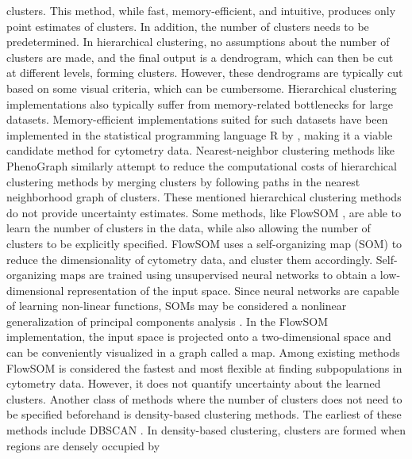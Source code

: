 \documentclass[12pt,]{article}
\begin{document}
clusters. This method, while fast, memory-efficient, and intuitive, produces
only point estimates of clusters. In addition, the number of clusters needs to
be predetermined.
In hierarchical clustering, no assumptions about the number of clusters are
made, and the final output is a dendrogram, which can then be cut at different
levels, forming clusters. However, these dendrograms are typically cut based on
some visual criteria, which can be cumbersome.  Hierarchical clustering
implementations also typically suffer from memory-related bottlenecks for large
datasets.  Memory-efficient implementations suited for such datasets have been
implemented in the statistical programming language R by
\citep{linderman2013package}, making it a viable candidate method for cytometry
data.
Nearest-neighbor clustering methods like PhenoGraph \citep{levine2015data}
similarly attempt to reduce the computational costs of hierarchical clustering
methods by merging clusters by following paths in the nearest neighborhood
graph of clusters.
%
These mentioned hierarchical clustering methods do not provide uncertainty
estimates.
%
Some methods, like FlowSOM \citep{van2015flowsom}, are able to learn the number
of clusters in the data, while also allowing the number of clusters to be
explicitly specified.  FlowSOM uses a self-organizing map (SOM) to reduce the
dimensionality of cytometry data, and cluster them accordingly. Self-organizing
maps are trained using unsupervised neural networks to obtain a low-dimensional
representation of the input space. Since neural networks are capable of
learning non-linear functions, SOMs may be considered a nonlinear
generalization of principal components analysis \citep{yin2008learning}. In the
FlowSOM implementation, the input space is projected onto a two-dimensional
space and can be conveniently visualized in a graph called a map.
Among existing methods FlowSOM is considered the fastest and most flexible at
finding subpopulations in cytometry data. However, it does not quantify
uncertainty about the learned clusters.
Another class of methods where the number of clusters does not need to be
specified beforehand is density-based clustering methods. The earliest of these
methods include DBSCAN \citep{ester1996density}. In density-based
clustering, clusters are formed when regions are densely occupied by
\end{document}
